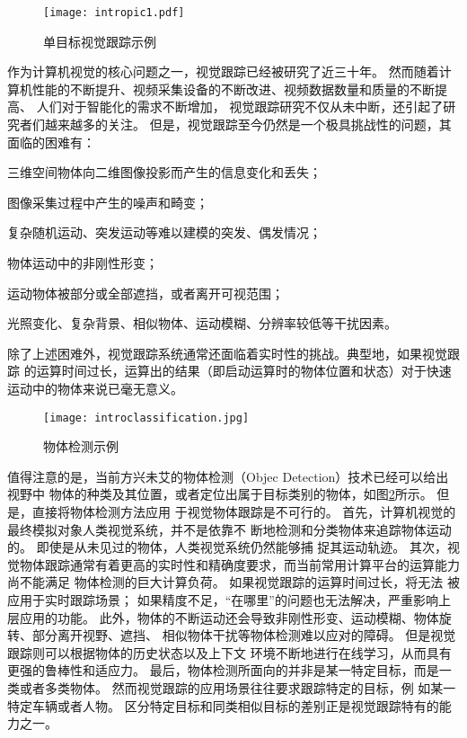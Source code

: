 \begin{figure}[htb]
\centering
\texttt{[image: intropic1.pdf]}
\caption{单目标视觉跟踪示例}
\label{intropic1}
\end{figure}

作为计算机视觉的核心问题之一，视觉跟踪已经被研究了近三十年。
然而随着计算机性能的不断提升、视频采集设备的不断改进、视频数据数量和质量的不断提高、
人们对于智能化的需求不断增加，
视觉跟踪研究不仅从未中断，还引起了研究者们越来越多的关注。
但是，视觉跟踪至今仍然是一个极具挑战性的问题，其面临的困难有：
\begin{compactitem}
\item 三维空间物体向二维图像投影而产生的信息变化和丢失；
\item 图像采集过程中产生的噪声和畸变；
\item 复杂随机运动、突发运动等难以建模的突发、偶发情况；
\item 物体运动中的非刚性形变；
\item 运动物体被部分或全部遮挡，或者离开可视范围；
\item 光照变化、复杂背景、相似物体、运动模糊、分辨率较低等干扰因素。
\end{compactitem}
除了上述困难外，视觉跟踪系统通常还面临着实时性的挑战。典型地，如果视觉跟踪
的运算时间过长，运算出的结果（即启动运算时的物体位置和状态）对于快速运动中的物体来说已毫无意义。

\begin{figure}[htb]
\centering
\texttt{[image: introclassification.jpg]}
\caption{物体检测示例}
\label{introclassification}
\end{figure}

值得注意的是，当前方兴未艾的物体检测（Objec Detection）技术已经可以给出视野中
物体的种类及其位置，或者定位出属于目标类别的物体，如图\ref{introclassification}所示。
但是，直接将物体检测方法应用
于视觉物体跟踪是不可行的。
首先，计算机视觉的最终模拟对象\pozhehao 人类视觉系统，并不是依靠不
断地检测和分类物体来追踪物体运动的。
即使是从未见过的物体，人类视觉系统仍然能够捕
捉其运动轨迹。
其次，视觉物体跟踪通常有着更高的实时性和精确度要求，而当前常用计算平台的运算能力尚不能满足
物体检测的巨大计算负荷。
如果视觉跟踪的运算时间过长，将无法
被应用于实时跟踪场景；
如果精度不足，``在哪里''的问题也无法解决，严重影响上层应用的功能。
此外，物体的不断运动还会导致非刚性形变、运动模糊、物体旋转、部分离开视野、遮挡、
相似物体干扰等物体检测难以应对的障碍。
但是视觉跟踪则可以根据物体的历史状态以及上下文
环境不断地进行在线学习，从而具有更强的鲁棒性和适应力。
最后，物体检测所面向的并非是某一特定目标，而是一类或者多类物体。
然而视觉跟踪的应用场景往往要求跟踪特定的目标，例
如某一特定车辆或者人物。
区分特定目标和同类相似目标的差别正是视觉跟踪特有的能力之一。

